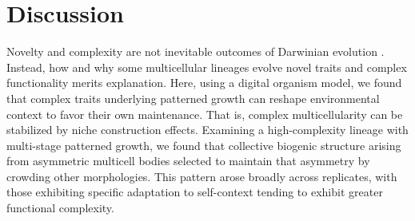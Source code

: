 \section{Discussion}
\label{sec:discussion}

Novelty and complexity are not inevitable outcomes of Darwinian evolution \citep{stanley2017open}.
Instead, how and why some multicellular lineages evolve novel traits and complex functionality merits explanation.
Here, using a digital organism model, we found that complex traits underlying patterned growth can reshape environmental context to favor their own maintenance.
That is, complex multicellularity can be stabilized by niche construction effects.
Examining a high-complexity lineage with multi-stage patterned growth, we found that collective biogenic structure arising from asymmetric multicell bodies selected to maintain that asymmetry by crowding other morphologies.
This pattern arose broadly across replicates, with those exhibiting specific adaptation to self-context tending to exhibit greater functional complexity.



